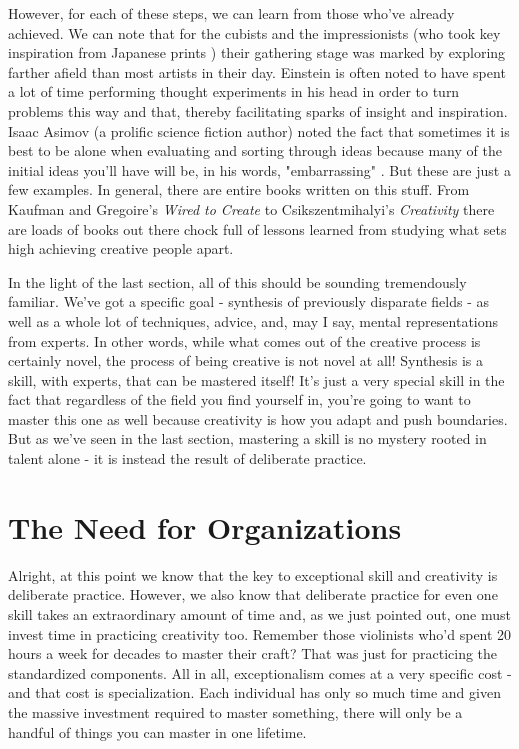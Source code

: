 \documentclass[11pt,a5paper]{book}
\begin{document}
However, for each of these steps, we can learn from those who've already achieved. We can note that for the cubists and the impressionists (who took key inspiration from Japanese prints \cite{impressionism}) their gathering stage was marked by exploring farther afield than most artists in their day. Einstein is often noted to have spent a lot of time performing thought experiments in his head in order to turn problems this way and that, thereby facilitating sparks of insight and inspiration. Isaac Asimov (a prolific science fiction author) noted the fact that sometimes it is best to be alone when evaluating and sorting through ideas because many of the initial ideas you'll have will be, in his words, "embarrassing" \cite{kaufman}. But these are just a few examples. In general, there are entire books written on this stuff. From Kaufman and Gregoire's \textit{Wired to Create} \cite{kaufman} to Csikszentmihalyi's \textit{Creativity} \cite{creativity} there are loads of books out there chock full of lessons learned from studying what sets high achieving creative people apart.
\newline

In the light of the last section, all of this should be sounding tremendously familiar. We've got a specific goal - synthesis of previously disparate fields - as well as a whole lot of techniques, advice, and, may I say, mental representations from experts. In other words, while what comes out of the creative process is certainly novel, the process of being creative is not novel at all! Synthesis is a skill, with experts, that can be mastered itself! It's just a very special skill in the fact that regardless of the field you find yourself in, you're going to want to master this one as well because creativity is how you adapt and push boundaries. But as we've seen in the last section, mastering a skill is no mystery rooted in talent alone - it is instead the result of deliberate practice. 

\section{The Need for Organizations}
Alright, at this point we know that the key to exceptional skill and creativity is deliberate practice. However, we also know that deliberate practice for even one skill takes an extraordinary amount of time and, as we just pointed out, one must invest time in practicing creativity too. Remember those violinists who'd spent 20 hours a week for decades to master their craft? That was just for practicing the standardized components. All in all, exceptionalism comes at a very specific cost - and that cost is specialization. Each individual has only so much time and given the massive investment required to master something, there will only be a handful of things you can master in one lifetime.
\newline
\end{document}
